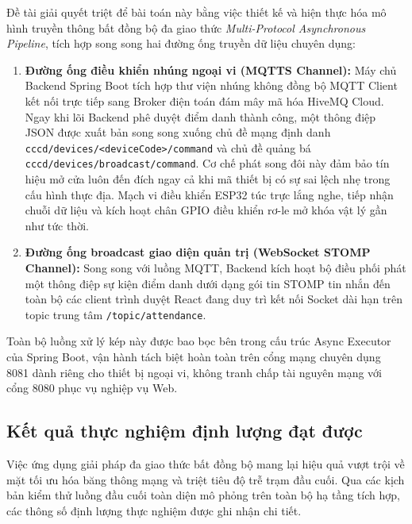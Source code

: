 \documentclass[../DoAn.tex]{subfiles}
\begin{document}
Đề tài giải quyết triệt để bài toán này bằng việc thiết kế và hiện thực hóa mô hình truyền thông bất đồng bộ đa giao thức \textit{Multi-Protocol Asynchronous Pipeline}, tích hợp song song hai đường ống truyền dữ liệu chuyên dụng:
\begin{enumerate}
    \item \textbf{Đường ống điều khiển nhúng ngoại vi (MQTTS Channel):} Máy chủ Backend Spring Boot tích hợp thư viện nhúng không đồng bộ MQTT Client kết nối trực tiếp sang Broker điện toán đám mây mã hóa HiveMQ Cloud. Ngay khi lõi Backend phê duyệt điểm danh thành công, một thông điệp JSON được xuất bản song song xuống chủ đề mạng định danh \texttt{cccd/devices/<deviceCode>/command} và chủ đề quảng bá \texttt{cccd/devices/broadcast/command}. Cơ chế phát song đôi này đảm bảo tín hiệu mở cửa luôn đến đích ngay cả khi mã thiết bị có sự sai lệch nhẹ trong cấu hình thực địa. Mạch vi điều khiển ESP32 túc trực lắng nghe, tiếp nhận chuỗi dữ liệu và kích hoạt chân GPIO điều khiển rơ-le mở khóa vật lý gần như tức thời.
    \item \textbf{Đường ống broadcast giao diện quản trị (WebSocket STOMP Channel):} Song song với luồng MQTT, Backend kích hoạt bộ điều phối phát một thông điệp sự kiện điểm danh dưới dạng gói tin STOMP tin nhắn đến toàn bộ các client trình duyệt React đang duy trì kết nối Socket dài hạn trên topic trung tâm \texttt{/topic/attendance}.
\end{enumerate}

Toàn bộ luồng xử lý kép này được bao bọc bên trong cấu trúc Async Executor của Spring Boot, vận hành tách biệt hoàn toàn trên cổng mạng chuyên dụng 8081 dành riêng cho thiết bị ngoại vi, không tranh chấp tài nguyên mạng với cổng 8080 phục vụ nghiệp vụ Web.

\subsection{Kết quả thực nghiệm định lượng đạt được}

Việc ứng dụng giải pháp đa giao thức bất đồng bộ mang lại hiệu quả vượt trội về mặt tối ưu hóa băng thông mạng và triệt tiêu độ trễ trạm đầu cuối. Qua các kịch bản kiểm thử luồng đầu cuối toàn diện mô phỏng trên toàn bộ hạ tầng tích hợp, các thông số định lượng thực nghiệm được ghi nhận chi tiết.
\end{document}
